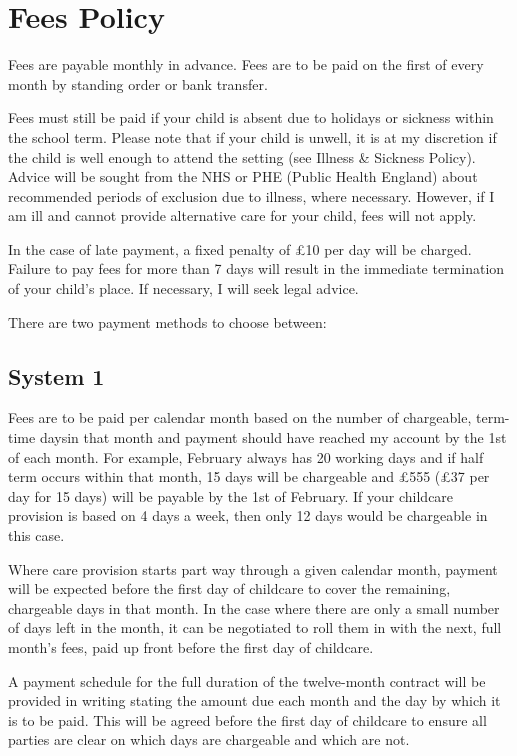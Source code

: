 

\section{Fees Policy}

Fees are payable monthly in advance. Fees are to be paid on the first of every month by standing order or bank transfer.

Fees must still be paid if your child is absent due to holidays or sickness within the school term. Please note that if your child is unwell, it is at my discretion if the child is well enough to attend the setting (see Illness \& Sickness Policy). Advice will be sought from the NHS or PHE (Public Health England) about recommended periods of exclusion due to illness, where necessary. However, if I am ill and cannot provide alternative care for your child, fees will not apply.

In the case of late payment, a fixed penalty of £10 per day will be charged. Failure to pay fees for more than 7 days will result in the immediate termination of your child's place. If necessary, I will seek legal advice.

There are two payment methods to choose between:

\subsection{System 1}

Fees are to be paid per calendar month based on the number of chargeable, term-time days\footnotemark[1]
in that month and payment should have reached my account by the 1st of each month. For example, February always has 20 working days and if half term occurs within that month, 15 days will be chargeable and £555 (£37 per day for 15 days) will be payable by the 1st of February. If your childcare provision is based on 4 days a week, then only 12 days would be chargeable in this case.

Where care provision starts part way through a given calendar month, payment will be expected before the first day of childcare to cover the remaining, chargeable days in that month. In the case where there are only a small number of days left in the month, it can be negotiated to roll them in with the next, full month's fees, paid up front before the first day of childcare.

A payment schedule for the full duration of the twelve-month contract will be provided in writing stating the amount due each month and the day by which it is to be paid. This will be agreed before the first day of childcare to ensure all parties are clear on which days are chargeable and which are not.

